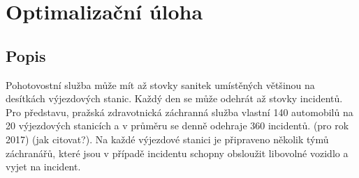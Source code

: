 \chapter{Optimalizační úloha}

\section{Popis}

Pohotovostní služba může mít až stovky sanitek umístěných většinou na desítkách výjezdových stanic.
Každý den se může odehrát až stovky incidentů.
Pro představu, pražská zdravotnická záchranná služba vlastní 140 automobilů na 20 výjezdových stanicích a v průměru se denně odehraje
360 incidentů. (pro rok 2017) (jak citovat?).
Na každé výjezdové stanici je připraveno několik týmů záchranářů, které jsou v případě incidentu schopny obsloužit libovolné vozidlo a vyjet na incident.



